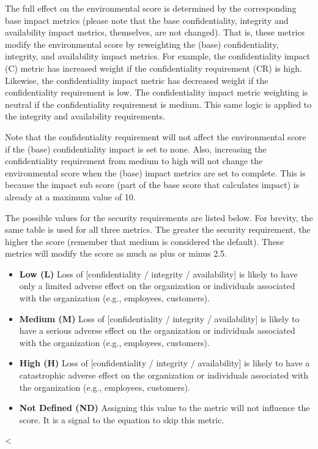         The full effect on the environmental score is determined by the
        corresponding base impact metrics (please note that the base
        confidentiality, integrity and availability impact metrics, themselves,
        are not changed). That is, these metrics modify the environmental score
        by reweighting the (base) confidentiality, integrity, and availability
        impact metrics. For example, the confidentiality impact (C) metric has
        increased weight if the confidentiality requirement (CR) is high.
        Likewise, the confidentiality impact metric has decreased weight if the
        confidentiality requirement is low. The confidentiality impact metric
        weighting is neutral if the confidentiality requirement is medium. This
        same logic is applied to the integrity and availability requirements.

        Note that the confidentiality requirement will not affect the
        environmental score if the (base) confidentiality impact is set to none.
        Also, increasing the confidentiality requirement from medium to high
        will not change the environmental score when the (base) impact metrics
        are set to complete. This is because the impact sub score (part of the
        base score that calculates impact) is already at a maximum value of 10.

        The possible values for the security requirements are listed below. For
        brevity, the same table is used for all three metrics. The greater the
        security requirement, the higher the score (remember that medium is
        considered the default). These metrics will modify the score as much as
        plus or minus 2.5.

        \begin{itemize}
          \item
            \textbf{Low (L)} Loss of {[}confidentiality / integrity /
            availability{]} is likely to have only a limited adverse effect on the
            organization or individuals associated with the organization (e.g.,
            employees, customers).
          \item
            \textbf{Medium (M)} Loss of {[}confidentiality / integrity /
            availability{]} is likely to have a serious adverse effect on the
            organization or individuals associated with the organization (e.g.,
            employees, customers).
          \item
            \textbf{High (H)} Loss of {[}confidentiality / integrity /
            availability{]} is likely to have a catastrophic adverse effect on the
            organization or individuals associated with the organization (e.g.,
            employees, customers).
          \item
            \textbf{Not Defined (ND)} Assigning this value to the metric will not
            influence the score. It is a signal to the equation to skip this
            metric.
        \end{itemize}


<%
